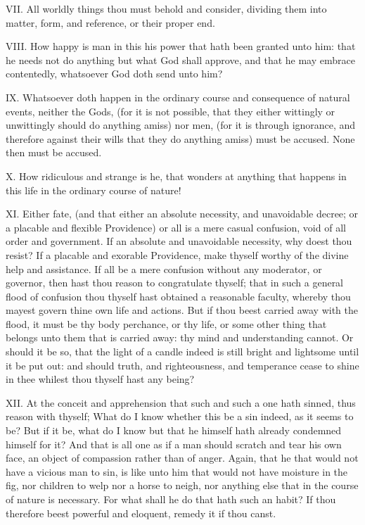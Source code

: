 VII. All worldly things thou must behold and consider, dividing them
into matter, form, and reference, or their proper end.

VIII. How happy is man in this his power that hath been granted unto
him: that he needs not do anything but what God shall approve, and that he
may embrace contentedly, whatsoever God doth send unto him?

IX. Whatsoever doth happen in the ordinary course and consequence of
natural events, neither the Gods, (for it is not possible, that they
either wittingly or unwittingly should do anything amiss) nor men, (for it
is through ignorance, and therefore against their wills that they do
anything amiss) must be accused. None then must be accused.

X. How ridiculous and strange is he, that wonders at anything that
happens in this life in the ordinary course of nature!

XI. Either fate, (and that either an absolute necessity, and unavoidable
decree; or a placable and flexible Providence) or all is a mere casual
confusion, void of all order and government. If an absolute and
unavoidable necessity, why doest thou resist? If a placable and exorable
Providence, make thyself worthy of the divine help and assistance. If all
be a mere confusion without any moderator, or governor, then hast thou
reason to congratulate thyself; that in such a general flood of confusion
thou thyself hast obtained a reasonable faculty, whereby thou mayest
govern thine own life and actions. But if thou beest carried away with the
flood, it must be thy body perchance, or thy life, or some other thing
that belongs unto them that is carried away: thy mind and understanding
cannot. Or should it be so, that the light of a candle indeed is still
bright and lightsome until it be put out: and should truth, and
righteousness, and temperance cease to shine in thee whilest thou thyself
hast any being?

XII. At the conceit and apprehension that such and such a one hath
sinned, thus reason with thyself; What do I know whether this be a sin
indeed, as it seems to be? But if it be, what do I know but that he
himself hath already condemned himself for it? And that is all one as if a
man should scratch and tear his own face, an object of compassion rather
than of anger. Again, that he that would not have a vicious man to sin, is
like unto him that would not have moisture in the fig, nor children to
welp nor a horse to neigh, nor anything else that in the course of nature
is necessary. For what shall he do that hath such an habit? If thou
therefore beest powerful and eloquent, remedy it if thou canst.

